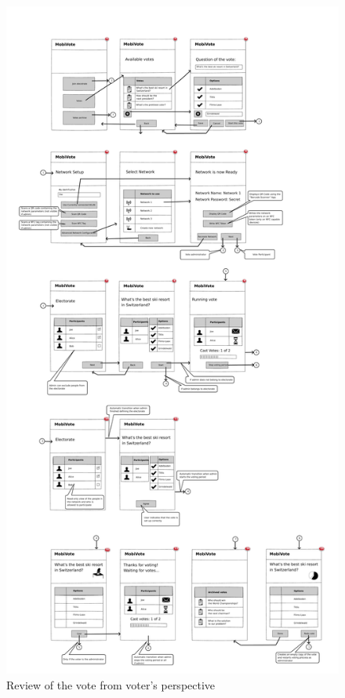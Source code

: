 \documentclass[numbers=noenddot, abstract=on, a4paper, headsepline,
footsepline, oneside, draft=off]{scrreprt}
\begin{document}
\begin{figure}[htb]
	\centering
	\includegraphics[height=.4\textheight]{img/storyboard/voter_review}
	\caption{Review of the vote from voter's perspective}
	\label{fig:voter_review}
\end{figure}
\end{document}
